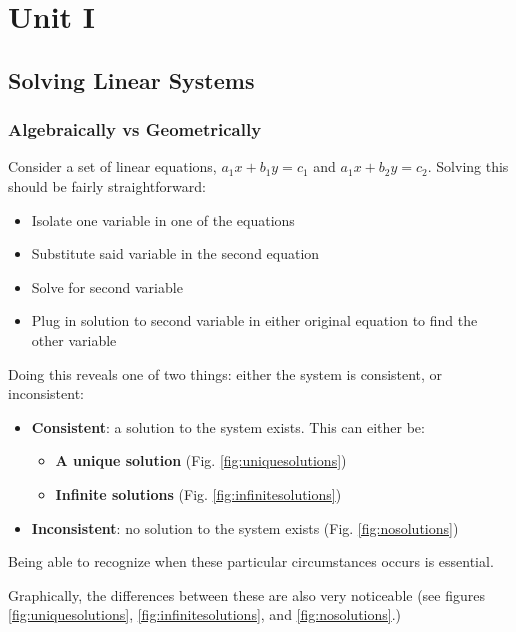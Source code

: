 \documentclass[12pt]{article}
\begin{document}
{
  \hypersetup{linkcolor=violet}
  \tableofcontents
}
\newpage
\pagestyle{mypage}
\section{Unit I}
\subsection{Solving Linear Systems}
\subsubsection{Algebraically vs Geometrically}
Consider a set of linear equations, $a_1 x+b_1 y = c_1$ and $a_1 x+b_2 y = c_2$. Solving this should be fairly straightforward:
\begin{itemize}
    \item Isolate one variable in one of the equations
    \item Substitute said variable in the second equation
    \item Solve for second variable
    \item Plug in solution to second variable in either original equation to find the other variable
\end{itemize}

Doing this reveals one of two things: either the system is consistent, or inconsistent:

\begin{itemize}\label{list:solntypes}
    \item \textbf{Consistent}: a solution to the system exists. This can either be:
    \begin{itemize}
        \item \textbf{A unique solution} (Fig. \ref{fig:uniquesolutions})
        \item \textbf{Infinite solutions} (Fig. \ref{fig:infinitesolutions})
    \end{itemize}
    \item \textbf{Inconsistent}: no solution to the system exists (Fig. \ref{fig:nosolutions})
\end{itemize}

Being able to recognize when these particular circumstances occurs is essential.

Graphically, the differences between these are also very noticeable (see figures  \ref{fig:uniquesolutions}, \ref{fig:infinitesolutions}, and \ref{fig:nosolutions}.)
\end{document}
